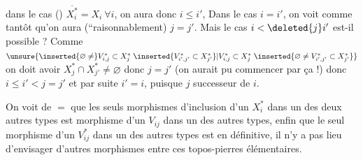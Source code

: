 dans le cas ()  $\overline{X_i^*}=X_i\ \forall i$, on aura donc $i\leq i'$, Dans  le cas $i=i'$, on voit comme tantôt qu'on aura (``raisonnablement) $j=j'$. Mais le cas $i<\deleted{j}i'$ est-il possible ? Comme $\unsure{\inserted{\varnothing\ne}V_{i,j}^*\subset X_j^*\;\inserted{V_{i',j'}^*\subset X_{j'}^*}|V_{i,j}^*\subset X_j^*\;\inserted{\varnothing\ne V_{i',j'}^*\subset X_{j'}^*}}$ on doit avoir $X_j^*\cap X_{j'}^*\ne\varnothing$ donc $j=j'$ (on aurait pu commencer par ça !)
donc  $i\leq i'<j=j'$ et par suite $i'=i$, puisque $j$ successeur de $i$.

On voit de $=$ que les seuls morphismes d'inclusion d'un $X_i^*$ dans un des deux autres types est
  morphisme d'un $V_{ij}$ dans un des autres types,  enfin que le seul morphisme d'un $V_{ij}^*$ dans un des autres types est
en définitive, il n'y a pas lieu d'envisager d'autres morphismes entre ces  topos-pierres élémentaires.

